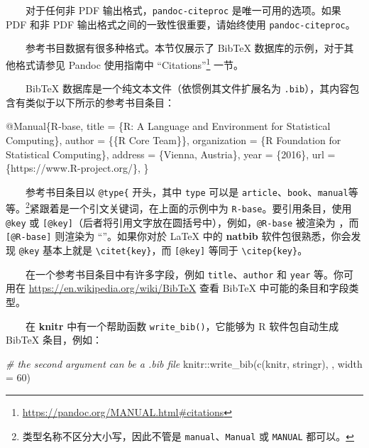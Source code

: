 \documentclass[
  12pt,
]{krantz}
\newenvironment{Shaded}{\begin{snugshade}}{\end{snugshade}}
\newcommand{\AttributeTok}[1]{\textcolor[rgb]{0.77,0.63,0.00}{#1}}
\newcommand{\CommentTok}[1]{\textcolor[rgb]{0.56,0.35,0.01}{\textit{#1}}}
\newcommand{\DataTypeTok}[1]{\textcolor[rgb]{0.13,0.29,0.53}{#1}}
\newcommand{\DecValTok}[1]{\textcolor[rgb]{0.00,0.00,0.81}{#1}}
\newcommand{\FunctionTok}[1]{\textcolor[rgb]{0.00,0.00,0.00}{#1}}
\newcommand{\NormalTok}[1]{#1}
\newcommand{\OtherTok}[1]{\textcolor[rgb]{0.56,0.35,0.01}{#1}}
\newcommand{\SpecialCharTok}[1]{\textcolor[rgb]{0.00,0.00,0.00}{#1}}
\newcommand{\StringTok}[1]{\textcolor[rgb]{0.31,0.60,0.02}{#1}}
\newcommand{\VariableTok}[1]{\textcolor[rgb]{0.00,0.00,0.00}{#1}}
\renewcommand{\href}[2]{#2\footnote{\url{#1}}}
\theoremstyle{definition}
\theoremstyle{definition}
\theoremstyle{definition}
\theoremstyle{definition}
\theoremstyle{remark}
\begin{document}
  对于任何非 PDF 输出格式，\texttt{pandoc-citeproc} 是唯一可用的选项。如果 PDF 和非 PDF 输出格式之间的一致性很重要，请始终使用 \texttt{pandoc-citeproc}。

  参考书目数据有很多种格式。本节仅展示了 BibTeX 数据库的示例，对于其他格式请参见 Pandoc 使用指南中 \href{https://pandoc.org/MANUAL.html\#citations}{``Citations''} 一节。

  BibTeX 数据库是一个纯文本文件（依惯例其文件扩展名为 \texttt{.bib}），其内容包含有类似于以下所示的参考书目条目：

\begin{Shaded}
\begin{Highlighting}[]
\VariableTok{@Manual}\NormalTok{\{}\OtherTok{R}\NormalTok{{-}}\OtherTok{base}\NormalTok{,}
  \DataTypeTok{title}\NormalTok{ = \{R: A Language and Environment for Statistical}
\NormalTok{    Computing\},}
  \DataTypeTok{author}\NormalTok{ = \{\{R Core Team\}\},}
  \DataTypeTok{organization}\NormalTok{ = \{R Foundation for Statistical Computing\},}
  \DataTypeTok{address}\NormalTok{ = \{Vienna, Austria\},}
  \DataTypeTok{year}\NormalTok{ = \{2016\},}
  \DataTypeTok{url}\NormalTok{ = \{https://www.R{-}project.org/\},}
\NormalTok{\}}
\end{Highlighting}
\end{Shaded}

  参考书目条目以 \texttt{@type\{} 开头，其中 \texttt{type} 可以是 \texttt{article}、\texttt{book}、\texttt{manual}等等。\footnote{类型名称不区分大小写，因此不管是 \texttt{manual}、\texttt{Manual} 或 \texttt{MANUAL} 都可以。}紧跟着是一个引文关键词，在上面的示例中为 \texttt{R-base}。要引用条目，使用 \texttt{@key} 或 \texttt{{[}@key{]}}（后者将引用文字放在圆括号中），例如，\texttt{@R-base} 被渲染为 \citet{R-base}，而 \texttt{{[}@R-base{]}} 则渲染为 ``\citep{R-base}''。如果你对於 LaTeX 中的 \textbf{natbib} 软件包很熟悉，你会发现 \texttt{@key} 基本上就是 \texttt{\textbackslash{}citet\{key\}}，而 \texttt{{[}@key{]}} 等同于 \texttt{\textbackslash{}citep\{key\}}。

  在一个参考书目条目中有许多字段，例如 \texttt{title}、\texttt{author} 和 \texttt{year} 等。你可用在 \url{https://en.wikipedia.org/wiki/BibTeX} 查看 BibTeX 中可能的条目和字段类型。

  在 \textbf{knitr} 中有一个帮助函数 \texttt{write\_bib()}，它能够为 R 软件包自动生成 BibTeX 条目，例如：

\begin{Shaded}
\begin{Highlighting}[]
\CommentTok{\# the second argument can be a .bib file}
\NormalTok{knitr}\SpecialCharTok{::}\FunctionTok{write\_bib}\NormalTok{(}\FunctionTok{c}\NormalTok{(}\StringTok{\textquotesingle{}knitr\textquotesingle{}}\NormalTok{, }\StringTok{\textquotesingle{}stringr\textquotesingle{}}\NormalTok{), }\StringTok{\textquotesingle{}\textquotesingle{}}\NormalTok{, }\AttributeTok{width =} \DecValTok{60}\NormalTok{)}
\end{Highlighting}
\end{Shaded}
\end{document}
